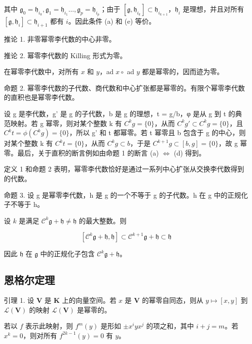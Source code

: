 其中 \(\mathfrak{g}_0 = \mathfrak{h}_{i_0},\mathfrak{g}_1 = \mathfrak{h}_{i_1}\dots ,\mathfrak{g}_p = \mathfrak{h}_{i_p}\)；由于 \([\mathfrak{g},\mathfrak{h}_{i_k}]\subset \mathfrak{h}_{i_{k + 1}}\)，\(\mathfrak{h}_i\) 是理想，并且对所有 \([\mathfrak{g},\mathfrak{h}_i]\subset \mathfrak{h}_{i + 1}\) 都有 \(i\)。因此条件 (a) 和 (e) 等价。

推论 1. 非零幂零李代数的中心非零。

推论 2. 幂零李代数的 Killing 形式为零。

在幂零李代数中，对所有 \(x\) 和 \(y\)，ad \(x \circ\) ad \(y\) 都是幂零的，因而迹为零。

命题 2. 幂零李代数的子代数、商代数和中心扩张都是幂零的。有限个幂零李代数的直积也是幂零李代数。

设 g 是李代数，g' 是 g 的子代数，b 是 g 的理想，t = g/b，φ 是从 g 到 t 的典范映射。若 g 幂零，则对某个整数 k 有 \(C^{k}g = \{0\}\)，从而 \(C^{k}g' \subset C^{k}g = \{0\}\)，且 \(C^{k}t = \phi(C^{k}g) = \{0\}\)，所以 g' 和 t 都幂零。若 t 幂零且 b 包含于 g 的中心，则对某个整数 k 有 \(C^{k}t = \{0\}\)，从而 \(C^{k}g \subset b\)，于是 \(C^{k+1}g \subset [b, g] = \{0\}\)，故 g 幂零。最后，关于直积的断言例如由命题 1 的断言 (a) \(\Leftrightarrow\) (d) 得到。

定义 1 和命题 2 表明，幂零李代数恰好是通过一系列中心扩张从交换李代数得到的代数。

命题 3. 设 g 是幂零李代数，h 是 g 的一个不等于 g 的子代数。h 在 g 中的正规化子不等于 h。

设 \(k\) 是满足 \(\mathcal{C}^k\mathfrak{g} + \mathfrak{h}\neq \mathfrak{h}\) 的最大整数。则

\[
[ \mathcal {C} ^ {k} \mathfrak {g} + \mathfrak {h}, \mathfrak {h} ] \subset \mathcal {C} ^ {k + 1} \mathfrak {g} + \mathfrak {h} \subset \mathfrak {h}
\]

因此 \(\mathfrak{h}\) 在 \(\mathfrak{g}\) 中的正规化子包含 \(\mathcal{C}^k\mathfrak{g} + \mathfrak{h}\)。

\subsection{恩格尔定理}

引理 1. 设 \(\mathbf{V}\) 是 \(\mathbf{K}\) 上的向量空间。若 \(x\) 是 \(\mathbf{V}\) 的幂零自同态，则从 \(y \mapsto [x, y]\) 到 \(\mathcal{L}(\mathbf{V})\) 的映射 \(\mathcal{L}(\mathbf{V})\) 是幂零的。

若以 \(f\) 表示此映射，则 \(f^m(y)\) 是形如 \(\pm x^i y x^j\) 的项之和，其中 \(i + j = m\)。若 \(x^k = 0\)，则对所有 \(f^{2k - 1}(y) = 0\) 有 \(y\)。

